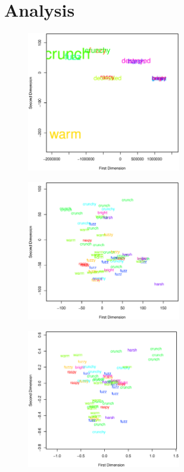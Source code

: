 \section{Analysis}
\label{sec:ListeningTests-Analysis}
	\begin{figure}[h!]
		\centering
		\includegraphics[width=0.6\textwidth]{chapter4/Images/DistortionDifferenceMDS.eps}
		\caption{}
		\label{fig:DistortionDifferenceMDS}
	\end{figure}

	\begin{figure}[h!]
		\centering
		\includegraphics[width=0.6\textwidth]{chapter4/Images/DistortionDifferenceTSNE.eps}
		\caption{}
		\label{fig:DistortionDifferenceTSNE}
	\end{figure}

	\begin{figure}[h!]
		\centering
		\includegraphics[width=0.6\textwidth]{chapter4/Images/DistortionProcessedMDS.eps}
		\caption{}
		\label{fig:DistortionProcessedMDS}
	\end{figure}

